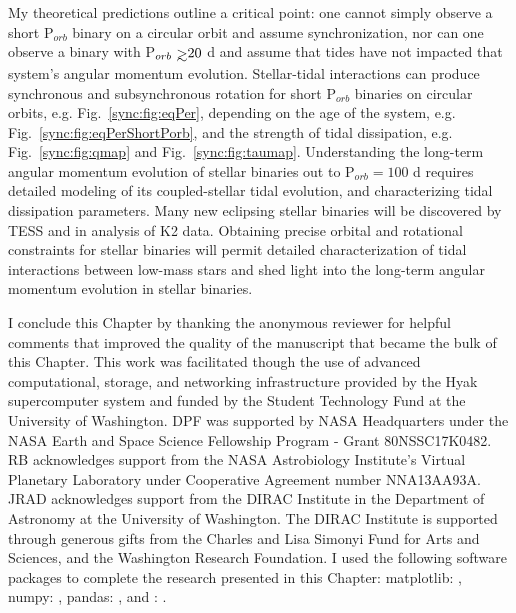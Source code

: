 My theoretical predictions outline a critical point: one cannot simply observe a short P$_{orb}$ binary on a circular orbit and assume synchronization, nor can one observe a binary with P$_{orb} \gsim 20$ d and assume that tides have not impacted that system's angular momentum evolution.  Stellar-tidal interactions can produce synchronous and subsynchronous rotation for short P$_{orb}$ binaries on circular orbits, e.g. Fig.~\ref{sync:fig:eqPer}, depending on the age of the system, e.g. Fig.~\ref{sync:fig:eqPerShortPorb}, and the strength of tidal dissipation, e.g. Fig.~\ref{sync:fig:qmap} and Fig.~\ref{sync:fig:taumap}.  Understanding the long-term angular momentum evolution of stellar binaries out to P$_{orb} = 100$ d requires detailed modeling of its coupled-stellar tidal evolution, and characterizing tidal dissipation parameters. Many new eclipsing stellar binaries will be discovered by TESS \citep[e.g.][]{Sullivan2015,Matson2018} and in analysis of K2 data.  Obtaining precise orbital and rotational constraints for stellar binaries will permit detailed characterization of tidal interactions between low-mass stars and shed light into the long-term angular momentum evolution in stellar binaries. 

I conclude this Chapter by thanking the anonymous reviewer for helpful comments that improved the quality of the manuscript that became the bulk of this Chapter. This work was facilitated though the use of advanced computational, storage, and networking infrastructure provided by the Hyak supercomputer system and funded by the Student Technology Fund at the University of Washington. DPF was supported by NASA Headquarters under the NASA Earth and Space Science Fellowship Program - Grant 80NSSC17K0482.  RB acknowledges support from the NASA Astrobiology Institute's Virtual Planetary Laboratory under Cooperative Agreement number NNA13AA93A. JRAD acknowledges support from the DIRAC Institute in the Department of Astronomy at the University of Washington. The DIRAC Institute is supported through generous gifts from the Charles and Lisa Simonyi Fund for Arts and Sciences, and the Washington Research Foundation. I used the following software packages to complete the research presented in this Chapter: matplotlib: \citet{Hunter2007}, numpy: \citet{vanderWalt2011}, pandas: \citet{Mckinney2010}, and \vplanet: \citet{Barnes2019}.

